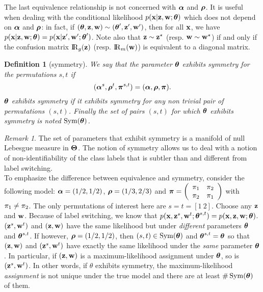 \documentclass[bj]{imsart}
\numberwithin{equation}{section}
\theoremstyle{plain}
\newtheorem{dof}[thm]{Definition}
\theoremstyle{remark}
\newtheorem{rem}[thm]{Remark}
\newcommand{\CK}[1]{\textcolor{red}{ #1}}
\begin{document}
  
The last equivalence relationship is not concerned with $\boldsymbol{\alpha}$ and $\boldsymbol{\rho}$. It is useful when dealing with the conditional likelihood $p(\mathbf{x}| \mathbf{z}, \mathbf{w}; \boldsymbol{\theta})$ which does not depend on $\boldsymbol{\alpha}$ and $\boldsymbol{\rho}$:  in fact, if $(\boldsymbol{\theta}, \mathbf{z}, \mathbf{w}) \sim (\boldsymbol{\theta}', \mathbf{z}', \mathbf{w}')$, then for all $\mathbf{x}$, we have $p(\mathbf{x}| \mathbf{z}, \mathbf{w}; \boldsymbol{\theta}) = p(\mathbf{x}| \mathbf{z}', \mathbf{w}'; \boldsymbol{\theta}')$. 
Note also that $\mathbf{z} \sim \mathbf{z}^\star$ (resp. $\mathbf{w} \sim \mathbf{w}^\star$) if and only if the confusion matrix $\Rgbz$ (resp. $\Rmbw$) is equivalent to a diagonal matrix. 

\begin{dof}[symmetry]
  \label{def:symmetry}
  We say that the parameter $\boldsymbol{\theta}$ \emph{exhibits symmetry for the permutations} $s,t$ if
  \begin{equation*}
    (\bpi^s, \brho^t, \bal^{s,t}) = (\bpi, \brho, \bal).
  \end{equation*}
  $\boldsymbol{\theta}$ \emph{exhibits symmetry} if it exhibits symmetry for any non trivial pair of permutations $(s,t)$. Finally the set of pairs $(s,t)$ for which $\boldsymbol{\theta}$ exhibits symmetry is noted $\operatorname{Sym}(\boldsymbol{\theta})$.
\end{dof}


\begin{rem}
  The set of parameters that exhibit symmetry is a manifold of null Lebesgue measure in $\boldsymbol{\Theta}$.  The notion of symmetry allows us to deal with a notion of non-identifiability of the class labels that is subtler than and different from label switching.\\
To emphasize the difference between equivalence and symmetry, consider the following model: $\boldsymbol{\alpha} = (1/2, 1/2)$, $\boldsymbol{\rho} = (1/3, 2/3)$ and $\bal = \left( \begin{array}{cc} \al_1 & \al_2 \\ \al_2 & \al_1 \end{array} \right) $ with $\pi_1 \neq \pi_2$. The only permutations of interest here are $s = t = [1\ 2]$. Choose any $\mathbf{z}$ and $\mathbf{w}$. Because of label switching, we know that $p(\mathbf{x}, \mathbf{z}^s, \mathbf{w}^t; \boldsymbol{\theta}^{s,t}) = p(\mathbf{x}, \mathbf{z}, \mathbf{w}; \boldsymbol{\theta})$. $(\mathbf{z}^s, \mathbf{w}^t)$ and $(\mathbf{z}, \mathbf{w})$ have the same likelihood but under \emph{different} parameters $\boldsymbol{\theta}$ and $\boldsymbol{\theta}^{s,t}$. If however, $\boldsymbol{\rho} = (1/2, 1/2)$, then $(s, t) \in \operatorname{Sym}(\boldsymbol{\theta})$ and $\boldsymbol{\theta}^{s,t} = \boldsymbol{\theta}$ so that $(\mathbf{z}, \mathbf{w})$ and $(\mathbf{z}^s, \mathbf{w}^t)$ have exactly the same likelihood under the \emph{same} parameter $\boldsymbol{\theta}$. In particular, if $(\mathbf{z}, \mathbf{w})$ is a maximum-likelihood assignment under $\boldsymbol{\theta}$, so is $(\mathbf{z}^s, \mathbf{w}^t)$. In other words, if $\theta$ exhibits symmetry,  the maximum-likelihood \emph{assignment} is not unique under the true model and there are at least $\# \operatorname{Sym}(\boldsymbol{\theta})$ of them. 
\end{rem}
\end{document}
